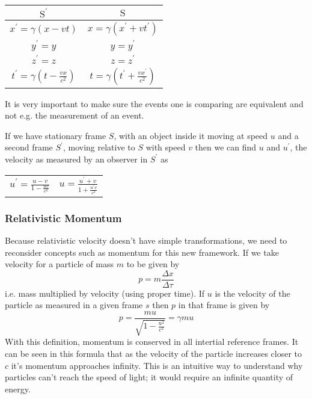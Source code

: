 \documentclass[12pt]{report}
\begin{document}
\begin{flushleft}
\begin{center}
    \begin{tabular}{c|c}
        \(\mathrm{S^\prime}\) & \(\mathrm{S}\) \\
        \hline
        \(x^\prime = \gamma(x - vt)\) & 
        \(x = \gamma(x^\prime + vt^\prime)\) \\[7pt]
        \(y^\prime = y\) & \(y = y^\prime\) \\[7pt]
        \(z^\prime = z\) & \(z = z^\prime\) \\[7pt]
        \(t^\prime = \gamma(t - \frac{vx}{c^2})\) &
        \(t = \gamma(t^\prime + \frac{vx^\prime}{c^2})\) \\[7pt]
    \end{tabular}
\end{center}

It is very important to make sure the events one is comparing are equivalent
and not e.g. the measurement of an event.

\bigskip
If we have stationary frame \(S\), with an object inside it moving at speed 
\(u\) and a second frame \(S^\prime\), moving relative to \(S\) with speed 
\(v\) then we can find \(u\) and \(u^\prime\), the velocity as measured by
an observer in \(S^\prime\) as
\begin{center}
    \begin{tabular}{c|c}
        \(u^\prime = \frac{u - v}{1 - \frac{uv}{c^2}}\) & 
        \(u = \frac{u^\prime + v}{1 + \frac{u^\prime v}{c^2}}\) \\
    \end{tabular}
\end{center}

\subsubsection*{Relativistic Momentum}
Because relativistic velocity doesn't have simple transformations, we need to
reconsider concepts such as momentum for this new framework. If we take 
velocity for a particle of mass \(m\) to be given by
\[p = m \frac{\Delta x}{\Delta \tau}\]
i.e. mass multiplied by velocity (using proper time). If \(u\) is the velocity
of the particle as measured in a given frame \(s\) then \(p\) in that frame is
given by
\[p = \frac{mu}{\sqrt{1 - \frac{u^2}{c^2}}} = \gamma mu\]
With this definition, momentum is conserved in all intertial reference frames.
It can be seen in this formula that as the velocity of the particle increases
closer to \(c\) it's momentum approaches infinity. This is an intuitive way to
understand why particles can't reach the speed of light; it would require an 
infinite quantity of energy.


\end{flushleft}
\end{document}
